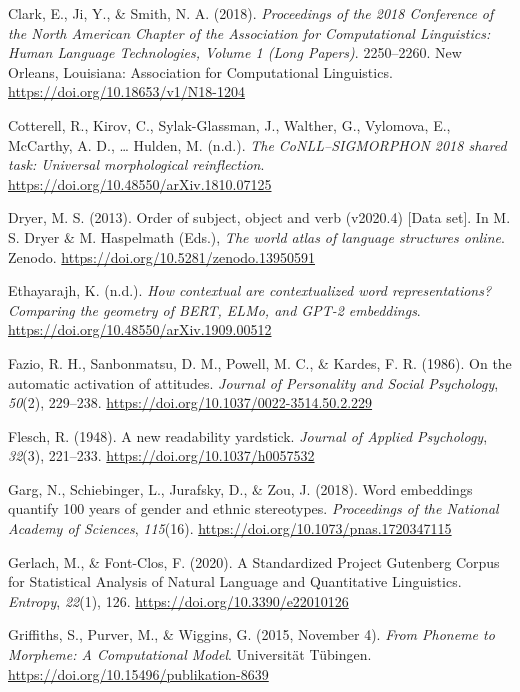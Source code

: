 \documentclass[
  english,
  man,floatsintext]{apa6}
\newlength{\cslhangindent}
\newenvironment{CSLReferences}[2] %
 {\begin{list}{}{%
  \setlength{\itemindent}{0pt}
  \setlength{\leftmargin}{0pt}
  \setlength{\parsep}{0pt}
  \ifodd #1
   \setlength{\leftmargin}{\cslhangindent}
   \setlength{\itemindent}{-1\cslhangindent}
  \fi
  \setlength{\itemsep}{#2\baselineskip}}}
 {\end{list}}
\begin{document}
\begin{CSLReferences}{1}{0}
Clark, E., Ji, Y., \& Smith, N. A. (2018). \emph{Proceedings of the 2018 Conference of the North American Chapter of the Association for Computational Linguistics: Human Language Technologies, Volume 1 (Long Papers)}. 2250--2260. New Orleans, Louisiana: Association for Computational Linguistics. \url{https://doi.org/10.18653/v1/N18-1204}

Cotterell, R., Kirov, C., Sylak-Glassman, J., Walther, G., Vylomova, E., McCarthy, A. D., \ldots{} Hulden, M. (n.d.). \emph{The CoNLL--SIGMORPHON 2018 shared task: Universal morphological reinflection}. \url{https://doi.org/10.48550/arXiv.1810.07125}

Dryer, M. S. (2013). Order of subject, object and verb (v2020.4) {[}Data set{]}. In M. S. Dryer \& M. Haspelmath (Eds.), \emph{The world atlas of language structures online}. Zenodo. \url{https://doi.org/10.5281/zenodo.13950591}

Ethayarajh, K. (n.d.). \emph{How contextual are contextualized word representations? Comparing the geometry of BERT, ELMo, and GPT-2 embeddings}. \url{https://doi.org/10.48550/arXiv.1909.00512}

Fazio, R. H., Sanbonmatsu, D. M., Powell, M. C., \& Kardes, F. R. (1986). On the automatic activation of attitudes. \emph{Journal of Personality and Social Psychology}, \emph{50}(2), 229--238. \url{https://doi.org/10.1037/0022-3514.50.2.229}

Flesch, R. (1948). A new readability yardstick. \emph{Journal of Applied Psychology}, \emph{32}(3), 221--233. \url{https://doi.org/10.1037/h0057532}

Garg, N., Schiebinger, L., Jurafsky, D., \& Zou, J. (2018). Word embeddings quantify 100 years of gender and ethnic stereotypes. \emph{Proceedings of the National Academy of Sciences}, \emph{115}(16). \url{https://doi.org/10.1073/pnas.1720347115}

Gerlach, M., \& Font-Clos, F. (2020). A Standardized Project Gutenberg Corpus for Statistical Analysis of Natural Language and Quantitative Linguistics. \emph{Entropy}, \emph{22}(1), 126. \url{https://doi.org/10.3390/e22010126}

Griffiths, S., Purver, M., \& Wiggins, G. (2015, November 4). \emph{From Phoneme to Morpheme: A Computational Model}. Universität Tübingen. \url{https://doi.org/10.15496/publikation-8639}


\end{CSLReferences}
\end{document}
